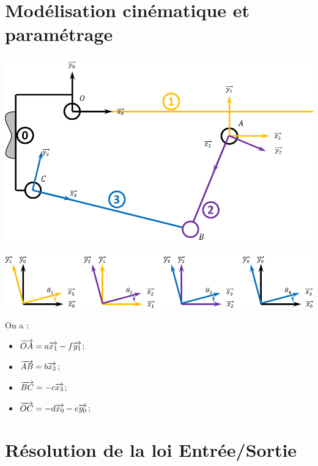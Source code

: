 \documentclass[10pt,fleqn]{article} %
\begin{document}

\vspace{2cm}
\pagestyle{fancy}
\thispagestyle{plain}



\section{Modélisation cinématique et paramétrage}
\begin{center}
\includegraphics[width=.5\textwidth]{images/Schema}
\end{center}

\begin{center}
\includegraphics[width=\textwidth]{images/Parametrage}
\end{center}

On a : 
\begin{multicols}{2}
\begin{itemize}
\item $\overrightarrow{OA} = a \overrightarrow{x_{1}}-f \overrightarrow{y_{1}}$;
\item $\overrightarrow{AB} = b \overrightarrow{x_{2}}$;
\item $\overrightarrow{BC} = -c \overrightarrow{x_{3}}$;
\item $\overrightarrow{OC} = -d \overrightarrow{x_{0}}-e\overrightarrow{y_{0}}$;
\end{itemize}
\end{multicols}

\section{Résolution de la loi Entrée/Sortie}
\end{document}
